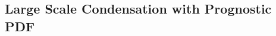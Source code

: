 \hypertarget{large-scale-condensation-with-prognostic-pdf}{%
\subsection{Large Scale Condensation with Prognostic PDF}\label{large-scale-condensation-with-prognostic-pdf}}
